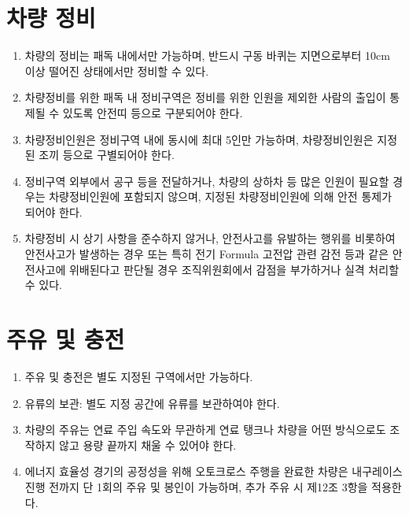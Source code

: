 \documentclass[final,a4paper,10pt]{report}
\begin{document}
{\section{차량 정비}\label{rule:formula-competition.vehicle-maintenance}
\begin{enumerate}
  \item\label{rule:formula-competition.vehicle-maintenance.paddock-lift-min-10cm} 차량의 정비는 패독 내에서만 가능하며, 반드시 구동 바퀴는 지면으로부터 10cm 이상 떨어진 상태에서만 정비할 수 있다.
  \item\label{rule:formula-competition.vehicle-maintenance.maintenance-zone-access-control} 차량정비를 위한 패독 내 정비구역은 정비를 위한 인원을 제외한 사람의 출입이 통제될 수 있도록 안전띠 등으로 구분되어야 한다.
  \item\label{rule:formula-competition.vehicle-maintenance.max-five-crew-vests} 차량정비인원은 정비구역 내에 동시에 최대 5인만 가능하며, 차량정비인원은 지정된 조끼 등으로 구별되어야 한다.
  \item\label{rule:formula-competition.vehicle-maintenance.external-helpers-not-counted} 정비구역 외부에서 공구 등을 전달하거나, 차량의 상하차 등 많은 인원이 필요할 경우는 차량정비인원에 포함되지 않으며, 지정된 차량정비인원에 의해 안전 통제가 되어야 한다.
  \item\label{rule:formula-competition.vehicle-maintenance.penalty-for-safety-violations} 차량정비 시 상기 사항을 준수하지 않거나, 안전사고를 유발하는 행위를 비롯하여 안전사고가 발생하는 경우 또는 특히 전기 Formula 고전압 관련 감전 등과 같은 안전사고에 위배된다고 판단될 경우 조직위원회에서 감점을 부가하거나 실격 처리할 수 있다.
\end{enumerate}

\section{주유 및 충전}\label{rule:formula-competition.refueling-and-charging}
\begin{enumerate}
  \item\label{rule:formula-competition.refueling-and-charging.designated-zone-only} 주유 및 충전은 별도 지정된 구역에서만 가능하다.
  \item\label{rule:formula-competition.refueling-and-charging.fuel-storage-location} 유류의 보관: 별도 지정 공간에 유류를 보관하여야 한다.
  \item\label{rule:formula-competition.refueling-and-charging.full-capacity-without-modification} 차량의 주유는 연료 주입 속도와 무관하게 연료 탱크나 차량을 어떤 방식으로도 조작하지 않고 용량 끝까지 채울 수 있어야 한다.
  \item\label{rule:formula-competition.refueling-and-charging.one-refuel-before-endurance} 에너지 효율성 경기의 공정성을 위해 오토크로스 주행을 완료한 차량은 내구레이스 진행 전까지 단 1회의 주유 및 봉인이 가능하며, 추가 주유 시 제12조 3항을 적용한다.
\end{enumerate}

}
\end{document}
